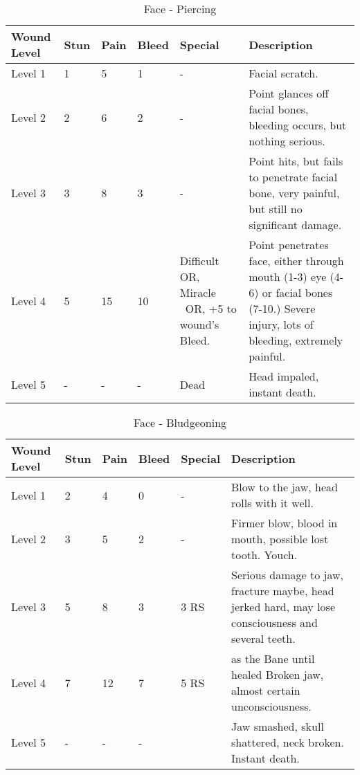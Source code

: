\documentclass[oneside,11pt,english]{book}
\begin{document}
\begin{table}[hb] %
	\caption{Face - Piercing}
	\label{wound:Face - Piercing}
	\begin{tabu} to 
Wound Level &Stun &Pain &Bleed &Special &Description\\\toprule
Level 1& 1& 5& 1& - &Facial scratch.\\
Level 2& 2& 6& 2& - &Point glances off facial bones, bleeding occurs, but nothing serious.\\
Level 3& 3& 8& 3& - &Point hits, but fails to penetrate facial bone, very painful, but still no significant damage.\\
Level 4& 5& 15& 10
	&Difficult~  OR,\newline
	Miracle~ ~OR,\newline
	+5 to wound’s Bleed.
&Point penetrates face, either through mouth (1-3) eye (4-6) or facial bones (7-10.) Severe injury, lots of bleeding, extremely painful.\\ %
Level 5& - &- &- &Dead& Head impaled, instant death.\\
	\end{tabu}
\end{table}

\begin{table}[hb] %
	\caption{Face - Bludgeoning}
	\label{wound:Face - Bludgeoning}
	\begin{tabu} to 
Wound Level &Stun &Pain &Bleed &Special &Description\\\toprule
Level 1 &2 &4 &0 &- &Blow to the jaw, head rolls with it well. \\
Level 2 &3 &5 &2 &- &Firmer blow, blood in mouth, possible lost tooth. Youch. \\
Level 3 &5 &8 &3 & 3 RS &Serious damage to jaw, fracture maybe, head jerked hard, may lose consciousness and several teeth.\\
Level 4 &7 &12&7 & 5 RS & as the Bane until healed Broken jaw, almost certain unconsciousness.\\
Level 5 &- &- &- & &Jaw smashed, skull shattered, neck broken. Instant death.\\
	\end{tabu}
\end{table}
\end{document}
